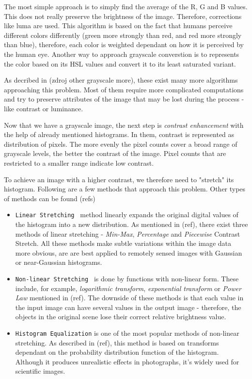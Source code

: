 The most simple approach is to simply find the average of the R, G and B values. This does not really preserve the brightness of the image. Therefore, corrections like luma are used. This algorithm is based on the fact that humans perceive different colors differently (green more strongly than red, and red more strongly than blue), therefore, each color is weighted dependant on how it is perceived by the human eye. Another way to approach grayscale converstion is to represents the color based on its HSL values and convert it to its least saturated variant.

As decribed in (zdroj other grayscale more), these exist many more algorithms approaching this problem. Most of them require more complicated computations and try to preserve attributes of the image that may be lost during the process - like contrast or luminance.

Now that we have a grayscale image, the next step is \emph{contrast enhancement} with the help of already mentioned histograms. In them, contrast is represented as distribution of pixels. The more evenly the pixel counts cover a broad range of grayscale levels, the better the contrast of the image.  Pixel counts that are restricted to a smaller range indicate low contrast.

To achieve an image with a higher contrast, we therefore need to "stretch" its histogram. Following are a few methods that approach this problem. Other types of methods can be found (refs)

\begin{itemize}

\item\texttt{Linear Stretching } method linearly expands the original digital values of the histogram into a new distribution. As mentioned in (ref), there exist three methods of linear stretching - \emph{Min-Max}, \emph{Percentage} and \emph{Piecewise} Contrast Stretch. All these methods make subtle variations within the image data more obvious, are are best applied to remotely
sensed images with Gaussian or near-Gaussian histograms.

\item\texttt{Non-linear Stretching } is done by functions with non-linear form. These include, for example, \emph{logarithmic transform}, \emph{exponential transform} or \emph{Power Law} mentioned in (ref). The downside of these methods is that each value in the input image can have several values in the output image - therefore, the objects in the original scene lose their correct relative brightness value.

\item\texttt{Histogram Equalization} is one of the most popular methods of non-linear stretching. As described in (ref), this method is based on transforms dependant on the probability distribution function of the histogram. Although it produces unrealistic effects in photographs, it's widely used for scientific images.

\end{itemize}

